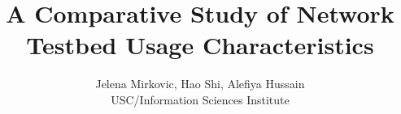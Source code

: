 \documentclass{sig-alt-nocopy}
\begin{document}
\renewcommand{\topfraction}{0.85}
\renewcommand{\textfraction}{0.1}
\renewcommand{\floatpagefraction}{0.75}


\title{A Comparative Study of Network Testbed Usage Characteristics
}

\newcommand{\FromA}{\raisebox{8pt}{$\dagger$}}
\newcommand{\FromAB}{\raisebox{8pt}{$\dagger\ddagger$}}

\author{
\alignauthor Jelena Mirkovic, Hao Shi, Alefiya Hussain \\
 \affaddr USC/Information Sciences Institute \\ 
}

\maketitle








%




\end{document}
